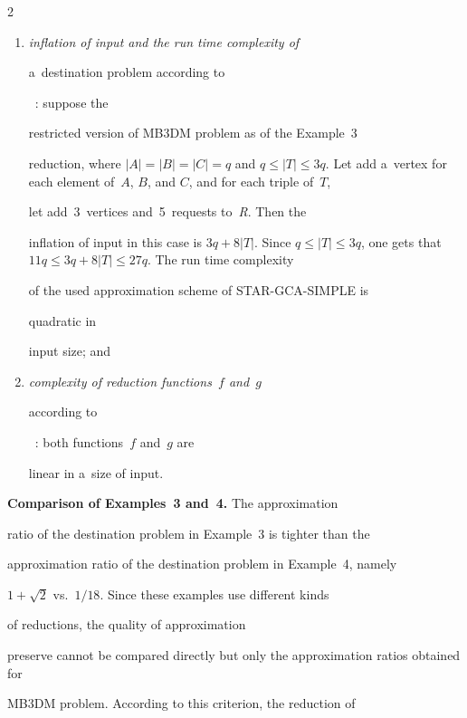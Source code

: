 \begin{multicols}{2}
\begin{enumerate}[(1)]
{problem according to}~\cite{AEMSSW2005}: the {STAR-GCA-SIMPLE}


problem can be approximated with the ratio~1/18;


\item {\it inflation of input and the run time complexity of


a~destination problem according to}~\cite{AEMSSW2005}: suppose the


restricted version of {MB3DM} problem as of the Example~3


reduction, where $|A|=|B|=|C|=q$ and $q\leq|T|\leq 3q$. Let add a~vertex for each element of~$A$, $B$, and $C$, and for each triple of~$T$,


let add~3~vertices and~5~requests to~\textit{R}. Then the


inflation of input in this case is $3q+8|T|$. Since $q \leq |T| \leq


3q$, one gets that $11q \leq 3q+8|T| \leq 27q$. The run time complexity


of the used approximation scheme of {STAR-GCA-SIMPLE} is


quadratic in


input size; and


\item {\it complexity of reduction functions~$f$ and~$g$


according to}~\cite{AEMSSW2005}: both functions~$f$ and~$g$ are


linear in a~size of input.


\end{enumerate}





\smallskip





\noindent


\textbf{Comparison of Examples~3 and~4.} The approximation


ratio of the destination problem in Example~3 is tighter than the


approximation ratio of the destination problem in Example~4, namely


$1+\sqrt{2}$ vs.\ $1/18$. Since these examples use different kinds


of reductions,  the quality of approximation


preserve cannot be compared directly but only the approximation ratios obtained for


{MB3DM} problem. According to this criterion, the reduction of



\end{multicols}

